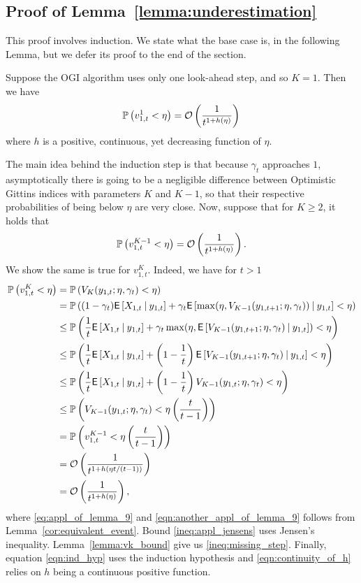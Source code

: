 \subsection{Proof of Lemma~\ref{lemma:underestimation}} \label{proof:underestimation_proof}
\begin{myproof}[Proof.]
	This proof involves induction. We state what the base case is, in the following Lemma, but we defer its proof to the end of the section.
	\begin{lemma} \label{lemma:underestimation_base_case}
		Suppose the OGI algorithm uses only one look-ahead step, and so $K = 1$. Then we have
		\[
		\P{v^1_{1,t} < \eta} = \mathcal{O}\left(\frac{1}{t^{1 + h(\eta)}}\right)
		\]
		where $h$ is a positive, continuous, yet decreasing function of $\eta$.
	\end{lemma}
	The main idea behind the induction step is that because $\gamma_t$ approaches $1$, asymptotically there is going to be a negligible difference between Optimistic Gittins indices with parameters $K$ and $K-1$, so that their respective probabilities of being below $\eta$ are very close. Now, suppose that for $K \ge 2$, it holds that
	\[
	\P{v^{K-1}_{1,t} < \eta} = \mathcal{O}\left(\frac{1}{t^{1 + h(\eta)}}\right).
	\]
	We show the same is true for $v^{K}_{1,t}$. Indeed, we have for $t > 1$
	\begin{align}
	\P{v^K_{1,t} < \eta} & = \P{V_K(y_{1,t}; \eta, \gamma_t) < \eta} \label{eq:appl_of_lemma_9}\\
	& = \P{(1-\gamma_t)\Ee{X_{1,t} \given y_{1,t}} + \gamma_t \Ee{\max(\eta, V_{K-1}(y_{1,t+1}; \eta, \gamma_{t})) \given y_{1,t}}< \eta} \nonumber \\
	& \le \P{\frac{1}{t}\Ee{X_{1,t} \given y_{1,t}} + \gamma_t \max(\eta, \Ee{V_{K-1}(y_{1,t+1}; \eta, \gamma_{t}) \given y_{1,t}})< \eta} \label{ineq:appl_jensens} \\
	& \le \P{\frac{1}{t}\Ee{X_{1,t} \given y_{1,t}} + \left(1-\frac{1}{t}\right) \Ee{V_{K-1}(y_{1,t+1}; \eta, \gamma_{t}) \given y_{1,t} }< \eta} \nonumber \\
	& \le \P{\frac{1}{t}\Ee{X_{1,t} \given y_{1,t}} + \left(1-\frac{1}{t}\right) V_{K-1}(y_{1,t}; \eta, \gamma_{t})< \eta} \label{ineq:missing_step} \\
	& \le \P{ V_{K-1}(y_{1,t}; \eta, \gamma_{t})< \eta \left(\frac{t}{t-1}\right)} \nonumber \\
	&  = \P{v^{K-1}_{1,t} < \eta\left(\frac{t}{t-1}\right)} \label{eqn:another_appl_of_lemma_9} \\
	& = \mathcal{O}\left(\frac{1}{t^{1 + h(\eta t/(t-1))}}\right) \label{eqn:ind_hyp}\\
	& =  \mathcal{O}\left(\frac{1}{t^{1 + h(\eta)}}\right) \label{eqn:continuity_of_h},
	\end{align}
	where \eqref{eq:appl_of_lemma_9} and \eqref{eqn:another_appl_of_lemma_9} follows from Lemma~\ref{cor:equivalent_event}. Bound \eqref{ineq:appl_jensens} uses Jensen's inequality. Lemma~\ref{lemma:vk_bound} give us \eqref{ineq:missing_step}. Finally, equation \eqref{eqn:ind_hyp} uses the induction hypothesis and \eqref{eqn:continuity_of_h} relies on $h$ being a continuous positive function.
	

\end{myproof}
